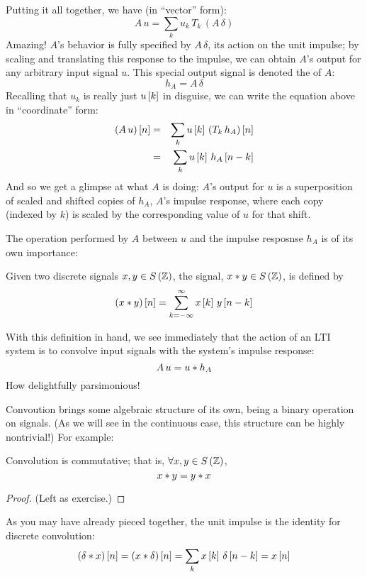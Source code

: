 Putting it all together, we have (in ``vector'' form):
\[ A \, u = \sum_k u_k \, T_k \, \left( A \, \delta \right) \]
Amazing! $A$'s behavior is fully specified by $A \, \delta$, its action on the unit impulse; by scaling and translating this response to the impulse, we can obtain $A$'s output for any arbitrary input signal $u$. This special output signal is denoted the  of $A$:
\[ h_A = A \, \delta \]
Recalling that $u_k$ is really just $u\left[ k \right]$ in disguise, we can write the equation above in ``coordinate'' form:
\begin{eqnarray*}
    \left(A \, u\right)\left[ n \right] & = & \sum_k u\left[ k \right] \, \left( T_k \, h_A \right)\left[ n \right] \\
      & = & \sum_k u\left[ k \right] \, h_A\left[ n - k \right] 
\end{eqnarray*}
And so we get a glimpse at what $A$ is doing: $A$'s output for $u$ is a superposition of scaled and shifted copies of $h_A$, $A$'s impulse response, where each copy (indexed by $k$) is scaled by the corresponding value of $u$ for that shift.

The operation performed by $A$ between $u$ and the impulse resposnse $h_A$ is of its own importance:
\begin{definition}
Given two discrete signals $x, y \in S\left( \mathbb{Z} \right)$, the  signal, $x \ast y \in S\left( \mathbb{Z} \right)$, is defined by
\[ \left(x \ast y\right)\left[ n \right] = \sum_{k = -\infty}^{\infty} x\left[ k \right] \, y\left[ n - k \right] \]
\end{definition}
With this definition in hand, we see immediately that the action of an LTI system is to convolve input signals with the system's impulse response:
\[ A \, u = u \ast h_A\]
How delightfully parsimonious!

Convoution brings some algebraic structure of its own, being a binary operation on signals. (As we will see in the continuous case, this structure can be highly nontrivial!) For example:
\begin{claim}
Convolution is commutative; that is, $\forall x,y \in S\left( \mathbb{Z} \right)$,
\[ x \ast y = y \ast x \]
\end{claim}
\begin{proof}
(Left as exercise.)
\end{proof}
As you may have already pieced together, the unit impulse is the identity for discrete convolution:
\[ \left(\delta \ast x\right)\left[ n \right] = \left(x \ast \delta\right)\left[ n \right] = \sum_k x\left[ k \right] \, \delta\left[ n - k \right] = x\left[ n \right] \]

